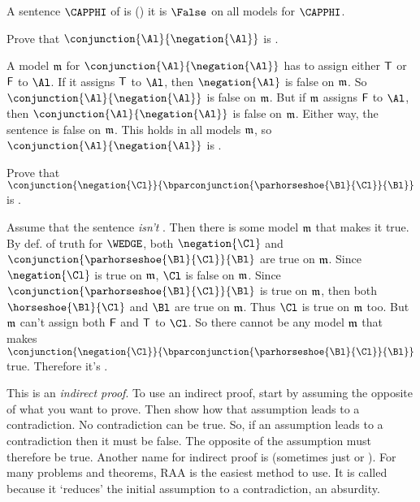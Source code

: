 \begin{majorILnc}{}
A sentence $\CAPPHI$ of \GSL{} is  () \Iff it is $\False$ on all models for $\CAPPHI$.
\end{majorILnc}

\begin{majorILnc}{}
	Prove that $\conjunction{\Al}{\negation{\Al}}$ is . 
	\begin{PROOF}
		A model $\mathfrak{m}$ for $\conjunction{\Al}{\negation{\Al}}$ has to assign either $\mathsf{T}$ or $\mathsf{F}$ to $\Al$. 
		If it assigns $\mathsf{T}$ to $\Al$, then $\negation{\Al}$ is false on $\mathfrak{m}$.
		So $\conjunction{\Al}{\negation{\Al}}$ is false on $\mathfrak{m}$.
		But if $\mathfrak{m}$ assigns $\mathsf{F}$ to $\Al$, then $\conjunction{\Al}{\negation{\Al}}$ is false on $\mathfrak{m}$. 
		Either way, the sentence is false on $\mathfrak{m}$.
		This holds in all models $\mathfrak{m}$, so $\conjunction{\Al}{\negation{\Al}}$ is .
	\end{PROOF}
\end{majorILnc}

\begin{majorILnc}{}
	Prove that $\conjunction{\negation{\Cl}}{\bparconjunction{\parhorseshoe{\Bl}{\Cl}}{\Bl}}$ is \CAPS{tff}.
	\begin{PROOF}
		Assume that the sentence \emph{isn't} \CAPS{tff}.
		Then there is some model $\mathfrak{m}$ that makes it true.
		By def. of truth for $\WEDGE$, both $\negation{\Cl}$ and $\conjunction{\parhorseshoe{\Bl}{\Cl}}{\Bl}$ are true on $\mathfrak{m}$.
		Since $\negation{\Cl}$ is true on $\mathfrak{m}$, $\Cl$ is false on $\mathfrak{m}$.
		Since $\conjunction{\parhorseshoe{\Bl}{\Cl}}{\Bl}$ is true on $\mathfrak{m}$, then both $\horseshoe{\Bl}{\Cl}$ and $\Bl$ are true on $\mathfrak{m}$.
		Thus $\Cl$ is true on $\mathfrak{m}$ too.
		But $\mathfrak{m}$ can't assign both $\mathsf{F}$ and $\mathsf{T}$ to $\Cl$.
		So there cannot be any model $\mathfrak{m}$ that makes $\conjunction{\negation{\Cl}}{\bparconjunction{\parhorseshoe{\Bl}{\Cl}}{\Bl}}$ true.
		Therefore it's \CAPS{TFF}.
	\end{PROOF}

	\begin{commentary}
		This is an \emph{indirect proof}.
		To use an indirect proof, start by assuming the opposite of what you want to prove.
		Then show how that assumption leads to a contradiction.
		No contradiction can be true.
		So, if an assumption leads to a contradiction then it must be false.
		The opposite of the assumption must therefore be true.
		\commentaryspace
		Another name for indirect proof is  (sometimes just  or ).  
		For many problems and theorems, RAA is the easiest method to use.
		It is called  because it `reduces' the initial assumption to a contradiction, an absurdity.
	\end{commentary}
\end{majorILnc}

